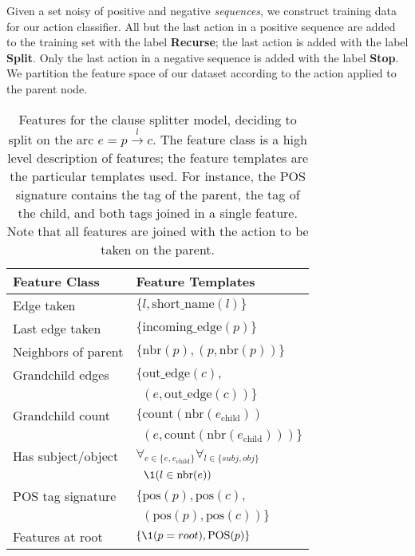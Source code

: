 
Given a set noisy of positive and negative \textit{sequences}, we construct 
  training data for our action classifier.
All but the last action in a positive sequence are added to the training set
  with the label \textbf{Recurse}; the last action is added with the label
  \textbf{Split}.
Only the last action in a negative sequence is added with the label \textbf{Stop}.
We partition the feature space of our dataset according to the action
  applied to the parent node.

%
%

\begin{table}
\begin{tabular}{ll}
  \textbf{Feature Class} & \textbf{Feature Templates} \\
  \hline
  Edge taken          & $\{ l, \textrm{short\_name}(l) \}$ \\
  Last edge taken     & $\{ \textrm{incoming\_edge}(p) \}$ \\
  Neighbors of parent & $\{ \textrm{nbr}(p), (p, \textrm{nbr}(p)) \}$ \\
  Grandchild edges    & $\{ \textrm{out\_edge}(c), $ \\
                      & $~~ (e, \textrm{out\_edge}(c)) \}$ \\
  Grandchild count    & $\{ \textrm{count}\left( \textrm{nbr}(e_\textrm{child}) \right) $ \\
                      & $~~ \left(e, \textrm{count}\left( \textrm{nbr}(e_\textrm{child}) \right) \right) \}$ \\
  Has subject/object  & $\forall_{e \in \{e, e_\textrm{child}\}} \forall_{l \in \{\textit{subj}, \textit{obj}\}} $ \\
                      & $~~ \1(l \in \textrm{nbr}(e)) $ \\
  POS tag signature   & $\{ \textrm{pos}(p), \textrm{pos}(c), $ \\
                      & $~~ \left( \textrm{pos}(p), \textrm{pos}(c) \right) \}$ \\
  Features at root    & $\{ \1(p = root), \textrm{POS}(p) \}$
\end{tabular}
\caption{\label{tab:features}
Features for the clause splitter model, deciding to split on the arc
  $e = p \xrightarrow{l} c$.
The feature class is a high level description of features; the feature
  templates are the particular templates used.
For instance, the POS signature contains the tag of the parent, the tag of
  the child, and both tags joined in a single feature.
Note that all features are joined with the action to be taken on the parent.
}
\end{table}

